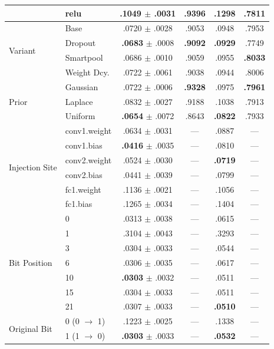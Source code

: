 \documentclass[a4paper,twoside]{article}
\begin{document}
\begin{table}[t]
{\begin{tabular}{llcccc}
 & relu    & .1049 $\pm$ .0031 & .9396 & .1298 & .7811 \\
\midrule
\multirow{4}{*}{Variant}
 & Base        & .0720 $\pm$ .0028 & .9053 & .0948 & .7953 \\
 & Dropout     & \textbf{.0683} $\pm$ .0008 & \textbf{.9092} & \textbf{.0929} & .7749 \\
 & Smartpool   & .0686 $\pm$ .0010 & .9059 & .0955 & \textbf{.8033} \\
 & Weight Dcy. & .0722 $\pm$ .0061 & .9038 & .0944 & .8006 \\
\midrule
\multirow{3}{*}{Prior}
 & Gaussian & .0722 $\pm$ .0006 & \textbf{.9328} & .0975 & \textbf{.7961} \\
 & Laplace  & .0832 $\pm$ .0027 & .9188 & .1038 & .7913 \\
 & Uniform  & \textbf{.0654} $\pm$ .0072 & .8643 & \textbf{.0822} & .7933 \\
\midrule
\multirow{6}{*}{Injection Site}
 & conv1.weight & .0634 $\pm$ .0031 & --- & .0887 & --- \\
 & conv1.bias   & \textbf{.0416} $\pm$ .0035 & --- & .0810 & --- \\
 & conv2.weight & .0524 $\pm$ .0030 & --- & \textbf{.0719} & --- \\
 & conv2.bias   & .0441 $\pm$ .0039 & --- & .0799 & --- \\
 & fc1.weight   & .1136 $\pm$ .0021 & --- & .1056 & --- \\
 & fc1.bias     & .1265 $\pm$ .0034 & --- & .1404 & --- \\
\midrule
\multirow{7}{*}{Bit Position}
 & 0  & .0313 $\pm$ .0038 & --- & .0615 & --- \\
 & 1  & .3104 $\pm$ .0043 & --- & .3293 & --- \\
 & 3  & .0304 $\pm$ .0033 & --- & .0544 & --- \\
 & 6  & .0306 $\pm$ .0035 & --- & .0617 & --- \\
 & 10 & \textbf{.0303} $\pm$ .0032 & --- & .0511 & --- \\
 & 15 & .0304 $\pm$ .0033 & --- & .0511 & --- \\
 & 21 & .0307 $\pm$ .0033 & --- & \textbf{.0510} & --- \\
\midrule
\multirow{2}{*}{Original Bit}
 & 0 (0 $\rightarrow$ 1) & .1223 $\pm$ .0025 & --- & .1338 & --- \\
 & 1 (1 $\rightarrow$ 0) & \textbf{.0303} $\pm$ .0033 & --- & \textbf{.0532} & --- \\

\bottomrule
\end{tabular}}
\end{table}
\end{document}
